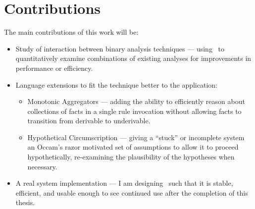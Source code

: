 \section{Contributions}
The main contributions of this work will be:
\begin{itemize}
       \item Study of interaction between binary analysis techniques --- using \sysname\ to quantitatively examine combinations of existing analyses for improvements in performance or efficiency.
       \item Language extensions to fit the technique better to the application:
       \begin{itemize}
         \item Monotonic Aggregators --- adding the ability to efficiently reason about collections of facts in a single rule invocation without allowing facts to transition from derivable to underivable.
         \item Hypothetical Circumscription --- giving a ``stuck'' or incomplete system an Occam's razor motivated set of assumptions to allow it to proceed hypothetically, re-examining the plausibility of the hypotheses when necessary.
       \end{itemize}
       \item A real system implementation --- I am designing \sysname\ such that it is stable, efficient, and usable enough to see continued use after the completion of this thesis.
\end{itemize}
